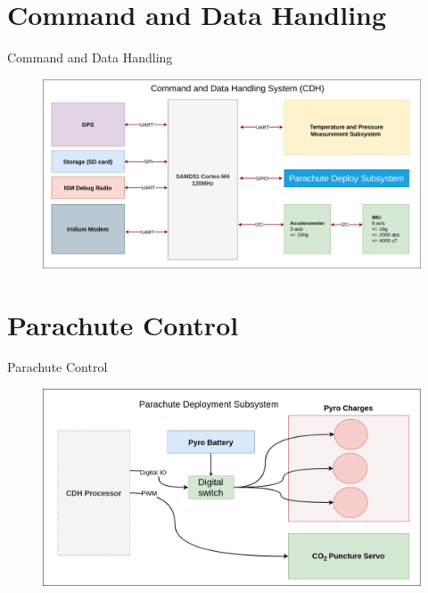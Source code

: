 \documentclass[UKenglish]{beamer}
\begin{document}
\section{Command and Data Handling}
\begin{frame}{Command and Data Handling}
	
	\begin{figure}[h!]
		\centering
		\includegraphics[width=\textwidth]{images/amtps-main-system.png}
	\end{figure}
	
\end{frame}


\section{Parachute Control}
\begin{frame}{Parachute Control}

	\begin{figure}[h!]
		\centering
		\includegraphics[width=\textwidth]{images/amtps-parachute.png}
	\end{figure}
	
\end{frame}
\end{document}
